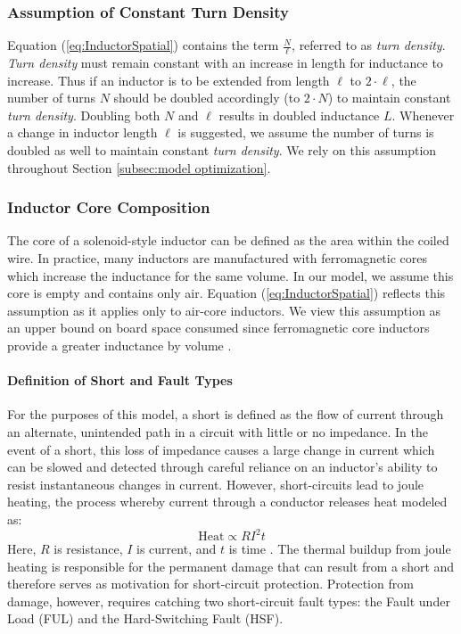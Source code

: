 \subsubsection{Assumption of Constant Turn Density} \label{ssec:Assumption of Constant}
Equation (\ref{eq:InductorSpatial}) contains the term $\frac{N}{\ell}$, referred to as \textit{turn density}. \textit{Turn density} must remain constant with an increase in length for inductance to increase. Thus if an inductor is to be extended from length $\ell$ to $2\cdot \ell$, the number of turns $N$ should be doubled accordingly (to $2\cdot N$) to maintain constant \textit{turn density}. Doubling both $N$ and $\ell$ results in doubled inductance $L$. Whenever a change in inductor length $\ell$ is suggested, we assume the number of turns is doubled as well to maintain constant \textit{turn density}. We rely on this assumption throughout Section \ref{subsec:model optimization}.
\subsubsection{Inductor Core Composition}
The core of a solenoid-style inductor can be defined as the area within the coiled wire. In practice, many inductors are manufactured with ferromagnetic cores which increase the inductance for the same volume. In our model, we assume this core is empty and contains only air. Equation (\ref{eq:InductorSpatial}) reflects this assumption as it applies only to air-core inductors. We view this assumption as an upper bound on board space consumed since ferromagnetic core inductors provide a greater inductance by volume \cite{gao_fabrication_2006}.

\paragraph{Definition of Short and Fault Types}
For the purposes of this model, a short is defined as the flow of current through an alternate, unintended path in a circuit with little or no impedance. In the event of a short, this loss of impedance causes a large change in current which can be slowed and detected through careful reliance on an inductor's ability to resist instantaneous changes in current. However, short-circuits lead to joule heating, the process whereby current through a conductor releases heat modeled as:
\begin{equation}\label{eq:JouleHeating}
\text{Heat} \propto R I^{2} t
\end{equation}
Here, $R$ is resistance, $I$ is current, and $t$ is time \cite{young_sears_2012}. The thermal buildup from joule heating is responsible for the permanent damage that can result from a short and therefore serves as motivation for short-circuit protection. Protection from damage, however, requires catching two short-circuit fault types: the Fault under Load (FUL) and the Hard-Switching Fault (HSF).

